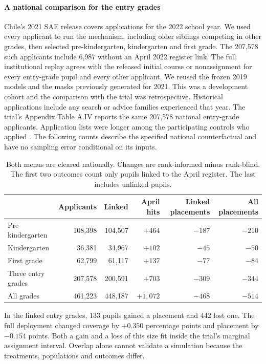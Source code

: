 \paragraph{A national comparison for the entry grades}
Chile's 2021 SAE release covers applications for the 2022 school year. We used every applicant to run the mechanism, including older siblings competing in other grades, then selected pre-kindergarten, kindergarten and first grade. The 207,578 such applicants include 6,987 without an April 2022 register link. The full institutional replay agrees with the released initial course or nonassignment for every entry-grade pupil and every other applicant. We reused the frozen 2019 models and the masks previously generated for 2021. This was a development cohort and the comparison with the trial was retrospective. Historical applications include any search or advice families experienced that year. The trial's Appendix Table A.IV reports the same 207,578 national entry-grade applicants. Application lists were longer among the participating controls who applied \citep{schoolSearch}. The following counts describe the specified national counterfactual and have no sampling error conditional on its inputs.

\begin{table}[ht]\centering\small
\caption{Both menus are cleared nationally. Changes are rank-informed minus rank-blind. The first two outcomes count only pupils linked to the April register. The last includes unlinked pupils.}\label{tab:entry-field}
\begin{tabular}{@{}lrrrrr@{}}\toprule
 & Applicants & Linked & April hits & Linked placements & All placements\\\midrule
Pre-kindergarten & 108,398 & 104,507 & $+464$ & $-187$ & $-210$\\
Kindergarten & 36,381 & 34,967 & $+102$ & $-45$ & $-50$\\
First grade & 62,799 & 61,117 & $+137$ & $-77$ & $-84$\\\midrule
Three entry grades & 207,578 & 200,591 & $+703$ & $-309$ & $-344$\\
All grades & 461,223 & 448,187 & $+1{,}072$ & $-468$ & $-514$\\\bottomrule
\end{tabular}
\end{table}
In the linked entry grades, 133 pupils gained a placement and 442 lost one. The full deployment changed coverage by $+0.350$ percentage points and placement by $-0.154$ points. Both a gain and a loss of this size fit inside the trial's marginal assignment interval. Overlap alone cannot validate a simulation because the treatments, populations and outcomes differ.

